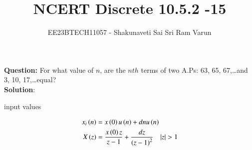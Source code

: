 \documentclass[journal,12pt,twocolumn]{IEEEtran}
\theoremstyle{remark}
\begin{document}

\vspace{3cm}

\title{NCERT Discrete 10.5.2 -15}
\author{EE23BTECH11057 - Shakunaveti Sai Sri Ram Varun$^{}$%
}
\maketitle
\newpage
\bigskip

\vspace{2cm}
\textbf{Question: }
For what value of $ n$, are the $ nth$ terms of two A.Ps: 63, 65, 67,\dots and 3, 10, 17,\dots equal?\\
\vspace{0.5cm}
\textbf{Solution}:

\begin{table}[htbp] 
\centering

\caption{input values}
\label{tab: Table 1}
\end{table}
\begin{align}
x_i\brak{n} &= x\brak{0}u\brak{n} + dnu\brak{n}\\
X\brak{z} &= \frac{x\brak{0}z}{z-1} + \frac{dz}{\brak{z-1}^{2}} \quad |z|>1\label{eq:5}
\end{align}
\end{document}
